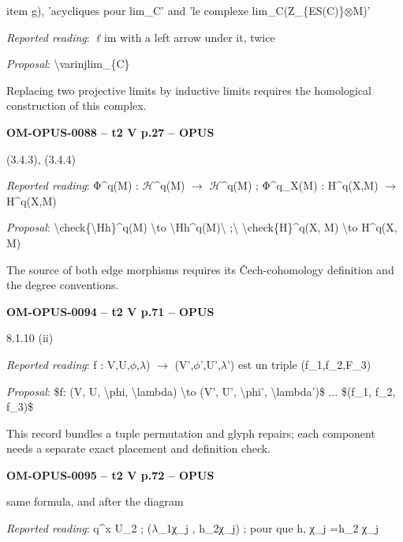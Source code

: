 item g), 'acycliques pour lim\_C' and 'le complexe lim\_C(Z\_\{ES(C)\}\ensuremath{\otimes}M)'\par
\emph{Reported reading}: \ensuremath{\ell}im with a left arrow under it, twice\par
\emph{Proposal}: \textbackslash{}varinjlim\_\{C\}\par
Replacing two projective limits by inductive limits requires the homological construction of this complex.\par
\par\noindent\textbf{OM-OPUS-0088 -- t2 V p.27 -- OPUS}\par
(3.4.3), (3.4.4)\par
\emph{Reported reading}: Φ\textasciicircum{}q(M) : \ensuremath{\mathcal{H}}\textasciicircum{}q(M) \ensuremath{\to} \ensuremath{\mathcal{H}}\textasciicircum{}q(M) ; Φ\textasciicircum{}q\_X(M) : H\textasciicircum{}q(X,M) \ensuremath{\to} H\textasciicircum{}q(X,M)\par
\emph{Proposal}: \textbackslash{}check\{\textbackslash{}Hh\}\textasciicircum{}q(M) \textbackslash{}to \textbackslash{}Hh\textasciicircum{}q(M)\textbackslash{} ;\textbackslash{} \textbackslash{}check\{H\}\textasciicircum{}q(X, M) \textbackslash{}to H\textasciicircum{}q(X, M)\par
The source of both edge morphisms requires its Čech-cohomology definition and the degree conventions.\par
\par\noindent\textbf{OM-OPUS-0094 -- t2 V p.71 -- OPUS}\par
8.1.10 (ii)\par
\emph{Reported reading}: f : V,U,\ensuremath{\phi},\ensuremath{\lambda}) \ensuremath{\longrightarrow} (V',\ensuremath{\phi}',U',\ensuremath{\lambda}') est un triple (f\_1,f\_2,F\_3)\par
\emph{Proposal}: \$f: (V, U, \textbackslash{}phi, \textbackslash{}lambda) \textbackslash{}to (V', U', \textbackslash{}phi', \textbackslash{}lambda')\$ ... \$(f\_1, f\_2, f\_3)\$\par
This record bundles a tuple permutation and glyph repairs; each component needs a separate exact placement and definition check.\par
\par\noindent\textbf{OM-OPUS-0095 -- t2 V p.72 -- OPUS}\par
same formula, and after the diagram\par
\emph{Reported reading}: q\textasciicircum{}x U\_2 ; (\ensuremath{\lambda}\_1χ\_j , h\_2χ\_j) ; pour que h, χ\_j =\allowbreak  h\_2 χ\_j\par
